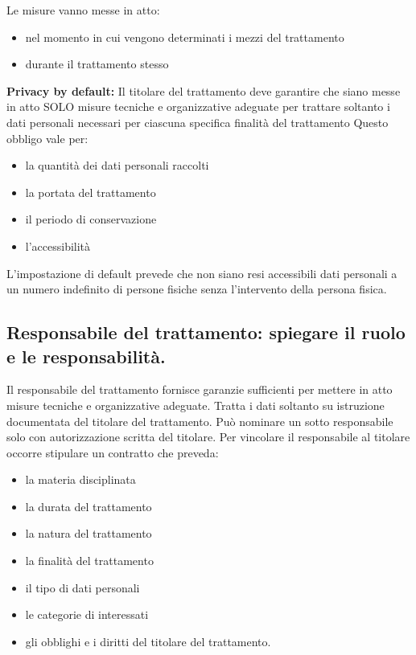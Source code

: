 Le misure vanno messe in atto:
\begin{itemize}
    \item nel momento in cui vengono determinati i mezzi del trattamento
    \item durante il trattamento stesso
\end{itemize}
\textbf{Privacy by default:}
\newline
Il titolare del trattamento deve garantire che siano messe in atto SOLO misure
tecniche e organizzative adeguate per trattare soltanto i dati personali
necessari per ciascuna specifica finalità del trattamento
\newline
Questo obbligo vale per:
\begin{itemize}
    \item la quantità dei dati personali raccolti
    \item la portata del trattamento
    \item il periodo di conservazione
    \item l'accessibilità
\end{itemize}
L'impostazione di default prevede che non siano resi accessibili dati personali
a un numero indefinito di persone fisiche senza l'intervento della persona
fisica.

\subsection{Responsabile del trattamento: spiegare il ruolo e le responsabilità.}

Il responsabile del trattamento fornisce garanzie sufficienti per mettere in
atto misure tecniche e organizzative adeguate.
Tratta i dati soltanto su istruzione documentata del titolare del trattamento.
\newline
Può nominare un sotto responsabile solo con autorizzazione scritta del titolare.
\newline
Per vincolare il responsabile al titolare occorre stipulare un contratto che preveda:
\begin{itemize}
    \item la materia disciplinata
    \item la durata del trattamento
    \item la natura del trattamento
    \item la finalità del trattamento
    \item il tipo di dati personali
    \item le categorie di interessati
    \item gli obblighi e i diritti del titolare del trattamento.
\end{itemize}

